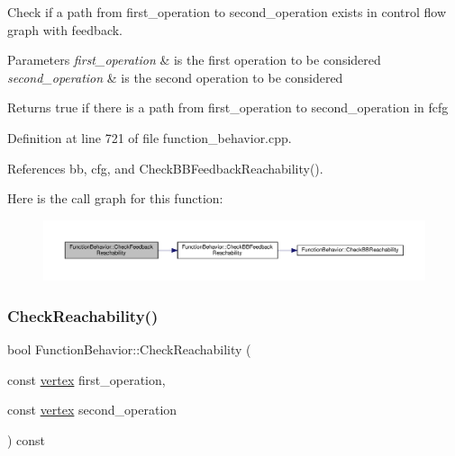 Check if a path from first\+\_\+operation to second\+\_\+operation exists in control flow graph with feedback. 


\begin{DoxyParams}{Parameters}
{\em first\+\_\+operation} & is the first operation to be considered \\
\hline
{\em second\+\_\+operation} & is the second operation to be considered \\
\hline
\end{DoxyParams}
\begin{DoxyReturn}{Returns}
true if there is a path from first\+\_\+operation to second\+\_\+operation in fcfg 
\end{DoxyReturn}


Definition at line 721 of file function\+\_\+behavior.\+cpp.



References bb, cfg, and Check\+B\+B\+Feedback\+Reachability().

Here is the call graph for this function\+:
\nopagebreak
\begin{figure}[H]
\begin{center}
\leavevmode
\includegraphics[width=350pt]{d9/d45/classFunctionBehavior_a5aa434e53a5779c8f64fc8acdaa86bf1_cgraph}
\end{center}
\end{figure}
\mbox{\label{classFunctionBehavior_abac17bd921424216c7f67c0a7d276c6e}} 
\subsubsection{\texorpdfstring{Check\+Reachability()}{CheckReachability()}}
{\footnotesize\ttfamily bool Function\+Behavior\+::\+Check\+Reachability (\begin{DoxyParamCaption}\item[{const \hyperlink{graph_8hpp_abefdcf0544e601805af44eca032cca14}{vertex}}]{first\+\_\+operation,  }\item[{const \hyperlink{graph_8hpp_abefdcf0544e601805af44eca032cca14}{vertex}}]{second\+\_\+operation }\end{DoxyParamCaption}) const}



